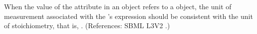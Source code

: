 When the value of the attribute  in an \InitialAssignment
object refers to a \SpeciesReference object, the unit of measurement
associated with the \InitialAssignment's  expression should be
consistent with the unit of stoichiometry, that is, .
(References: SBML L3V2 .)
